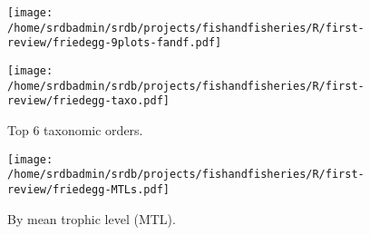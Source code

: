 




\begin{landscape}
\begin{figure}
\begin{center}
\texttt{[image: /home/srdbadmin/srdb/projects/fishandfisheries/R/first-review/friedegg-9plots-fandf.pdf]}
\end{center}\label{fig:friedegg}
\end{figure}
\end{landscape}

\begin{figure}
\begin{center}
\texttt{[image: /home/srdbadmin/srdb/projects/fishandfisheries/R/first-review/friedegg-taxo.pdf]}
\end{center}
\caption{Top 6 taxonomic orders. }
\label{fig:taxo}
\end{figure}

\begin{figure}
\begin{center}
\texttt{[image: /home/srdbadmin/srdb/projects/fishandfisheries/R/first-review/friedegg-MTLs.pdf]}
\end{center}
\caption{By mean trophic level (MTL).}
\label{fig:mtl}
\end{figure}





